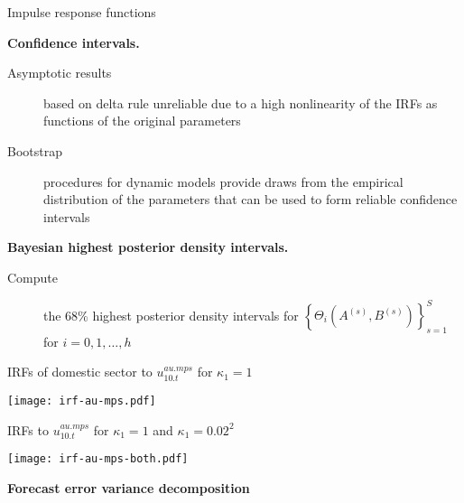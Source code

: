 \documentclass[notes,blackandwhite,mathsans,usenames,dvipsnames]{beamer}
\begin{document}
\begin{frame}{Impulse response functions}

\textbf{Confidence intervals.}
\begin{description}
\item[Asymptotic results]{\color{mcxs2} based on delta rule unreliable due to a high nonlinearity of the IRFs as functions of the original parameters}
\item[Bootstrap] {\color{mcxs2}procedures for dynamic models provide draws from the empirical distribution of the parameters that can be used to form reliable confidence intervals} 
\end{description}


\bigskip\textbf{Bayesian highest posterior density intervals.}
\begin{description}
\item[Compute] {\color{mcxs2}the 68\% highest posterior density intervals for} $\left\{\Theta_i\left(A^{(s)},B^{(s)}\right)\right\}_{s=1}^{S}$ {\color{mcxs2}for} $i=0,1, \dots, h$
\end{description}

\end{frame}

\begin{frame}{IRFs of domestic sector to $u_{10.t}^{au.mps}$ for {\color{mcxs1}$\kappa_1=1$}}

\centering
\texttt{[image: irf-au-mps.pdf]}

\end{frame}



\begin{frame}{IRFs to $u_{10.t}^{au.mps}$ for {\color{mcxs1}$\kappa_1=1$} and {\color{mcxs2}$\kappa_1=0.02^2$}}

\centering
\texttt{[image: irf-au-mps-both.pdf]}

\end{frame}





{
\begin{frame}

\begin{adjustwidth}{-0.5cm}{0cm}
\vspace{8.3cm}\Large
\textbf{{\color{mcxs2}Forecast error variance} {\color{mcxs1}decomposition}}
\end{adjustwidth}

\end{frame}
}
\end{document}
